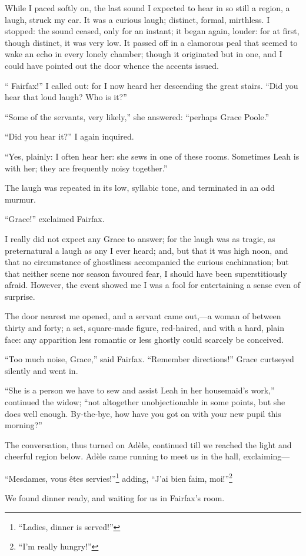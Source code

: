 While I paced softly on, the last sound I expected to hear in so still a
region, a laugh, struck my ear. It was a curious laugh; distinct,
formal, mirthless. I stopped: the sound ceased, only for an instant; it
began again, louder: for at first, though distinct, it was very low. It
passed off in a clamorous peal that seemed to wake an echo in every
lonely chamber; though it originated but in one, and I could have
pointed out the door whence the accents issued.

\enquote{\Mrs{} Fairfax!} I called out: for I now heard her descending the
great stairs. \enquote{Did you hear that loud laugh? Who is it?}

\enquote{Some of the servants, very likely,} she answered:
\enquote{perhaps Grace Poole.}

\enquote{Did you hear it?} I again inquired.

\enquote{Yes, plainly: I often hear her: she sews in one of these
	rooms. Sometimes Leah is with her; they are frequently noisy together.}

The laugh was repeated in its low, syllabic tone, and terminated in an
odd murmur.

\enquote{Grace!} exclaimed \Mrs{} Fairfax.

I really did not expect any Grace to answer; for the laugh was as
tragic, as preternatural a laugh as any I ever heard; and, but that it
was high noon, and that no circumstance of ghostliness accompanied the
curious cachinnation; but that neither scene nor season favoured fear, I
should have been superstitiously afraid. However, the event showed me I
was a fool for entertaining a sense even of surprise.

The door nearest me opened, and a servant came out,---a woman of between
thirty and forty; a set, square-made figure, red-haired, and with a
hard, plain face: any apparition less romantic or less ghostly could
scarcely be conceived.

\enquote{Too much noise, Grace,} said \Mrs{} Fairfax. \enquote{Remember
	directions!} Grace curtseyed silently and went in.

\enquote{She is a person we have to sew and assist Leah in her
	housemaid's work,} continued the widow; \enquote{not altogether
	unobjectionable in some points, but she does well enough. By-the-bye,
	how have you got on with your new pupil this morning?}

The conversation, thus turned on Adèle, continued till we reached the
light and cheerful region below. Adèle came running to meet us in the
hall, exclaiming---

\foreignquote{french}{Mesdames, vous êtes servies!}\footnote{\enquote{Ladies, dinner is served!}} adding, \foreignquote{french}{J'ai bien faim, moi!}\footnote{\enquote{I'm really hungry!}}

We found dinner ready, and waiting for us in \Mrs{} Fairfax's room.
